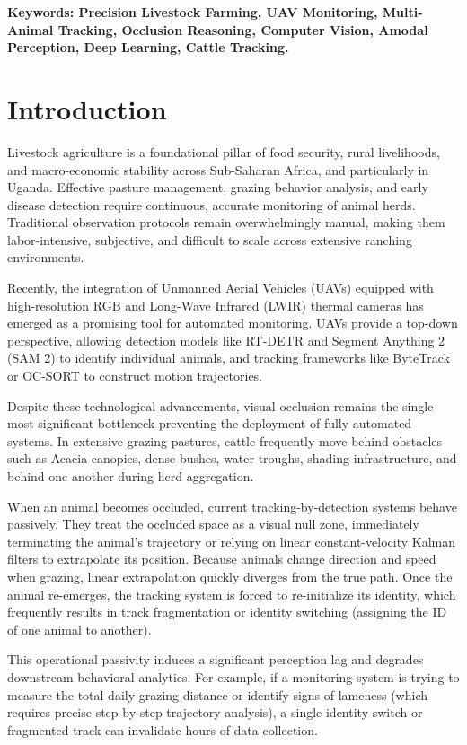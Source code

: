 \documentclass[10pt,conference,letterpaper,twocolumn]{article}
\begin{document}
\textbf{\small Keywords: Precision Livestock Farming, UAV Monitoring, Multi-Animal Tracking, Occlusion Reasoning, Computer Vision, Amodal Perception, Deep Learning, Cattle Tracking.}

\section{Introduction}
Livestock agriculture is a foundational pillar of food security, rural livelihoods, and macro-economic stability across Sub-Saharan Africa, and particularly in Uganda. Effective pasture management, grazing behavior analysis, and early disease detection require continuous, accurate monitoring of animal herds. Traditional observation protocols remain overwhelmingly manual, making them labor-intensive, subjective, and difficult to scale across extensive ranching environments.

Recently, the integration of Unmanned Aerial Vehicles (UAVs) equipped with high-resolution RGB and Long-Wave Infrared (LWIR) thermal cameras has emerged as a promising tool for automated monitoring. UAVs provide a top-down perspective, allowing detection models like RT-DETR \cite{lv2023detrs} and Segment Anything 2 (SAM 2) \cite{ravi2024sam2} to identify individual animals, and tracking frameworks like ByteTrack \cite{zhang2022bytetrack} or OC-SORT \cite{cao2023ocsort} to construct motion trajectories.

Despite these technological advancements, visual occlusion remains the single most significant bottleneck preventing the deployment of fully automated systems. In extensive grazing pastures, cattle frequently move behind obstacles such as Acacia canopies, dense bushes, water troughs, shading infrastructure, and behind one another during herd aggregation. 

When an animal becomes occluded, current tracking-by-detection systems behave passively. They treat the occluded space as a visual null zone, immediately terminating the animal's trajectory or relying on linear constant-velocity Kalman filters to extrapolate its position. Because animals change direction and speed when grazing, linear extrapolation quickly diverges from the true path. Once the animal re-emerges, the tracking system is forced to re-initialize its identity, which frequently results in track fragmentation or identity switching (assigning the ID of one animal to another). 

This operational passivity induces a significant perception lag and degrades downstream behavioral analytics. For example, if a monitoring system is trying to measure the total daily grazing distance or identify signs of lameness (which requires precise step-by-step trajectory analysis), a single identity switch or fragmented track can invalidate hours of data collection.
\end{document}
